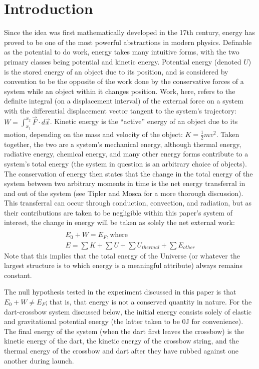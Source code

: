 \documentclass[reprint,amsmath,amssymb,aps,twoside]{revtex4-2}
\begin{document}
\section{Introduction}
Since the idea was first mathematically developed in the 17th century, energy has proved to be one of the most powerful abstractions in modern physics. Definable as the potential to do work, energy takes many intuitive forms, with the two primary classes being potential and kinetic energy. Potential energy (denoted $U$) is the stored energy of an object due to its position, and is considered by convention to be the opposite of the work done by the conservative forces of a system while an object within it changes position. Work, here, refers to the definite integral (on a displacement interval) of the external force on a system with the differential displacement vector tangent to the system’s trajectory: $W=\int_{x_1}^{x_2} \vec{F}\cdot d\vec{x}$. Kinetic energy is the “active” energy of an object due to its motion, depending on the mass and velocity of the object: $K=\frac{1}{2}mv^2$. Taken together, the two are a system’s mechanical energy, although thermal energy, radiative energy, chemical energy, and many other energy forms contribute to a system’s total energy (the system in question is an arbitrary choice of objects). The conservation of energy then states that the change in the total energy of the system between two arbitrary moments in time is the net energy transferral in and out of the system (see Tipler and Mosca for a more thorough discussion). This transferral can occur through conduction, convection, and radiation, but as their contributions are taken to be negligible within this paper’s system of interest, the change in energy will be taken as solely the net external work:
\begin{gather*}
    \\ E_0 + W = E_F, \text{where}
    \\ E = \sum K + \sum U + \sum U_{thermal} + \sum E_{other}
\end{gather*}
Note that this implies that the total energy of the Universe (or whatever the largest structure is to which energy is a meaningful attribute) always remains constant.

The null hypothesis tested in the experiment discussed in this paper is that $E_0 + W \neq E_F$; that is, that energy is not a conserved quantity in nature. For the dart-crossbow system discussed below, the initial energy consists solely of elastic and gravitational potential energy (the latter taken to be 0J for convenience). The final energy of the system (when the dart first leaves the crossbow) is the kinetic energy of the dart, the kinetic energy of the crossbow string, and the thermal energy of the crossbow and dart after they have rubbed against one another during launch.
\end{document}
